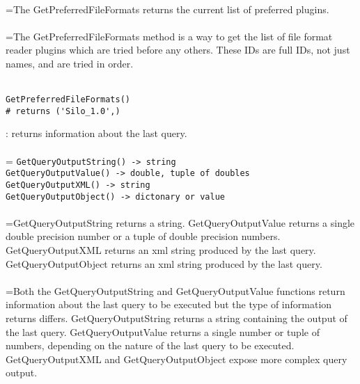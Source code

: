 \documentclass[10pt,a4paper]{report}
\begin{document}
 \\ 
\hangindent=\parindent The GetPreferredFileFormats returns the current list of preferred plugins. \\[-3mm] 

 \\ 
\hangindent=\parindent The GetPreferredFileFormats method is a way to get the list of file format reader plugins which are tried before any others. These IDs are full IDs, not just names, and are tried in order. \\[-3mm] 

\\[-6mm]
\begin{verbatim}GetPreferredFileFormats()
# returns ('Silo_1.0',)
\end{verbatim}
\newpage


{}
: returns information about the last query.\\[-3mm]

 \\ 
\hangindent=\parindent 
\verb!GetQueryOutputString() -> string!\\ 
\verb!GetQueryOutputValue() -> double, tuple of doubles!\\ 
\verb!GetQueryOutputXML() -> string!\\ 
\verb!GetQueryOutputObject() -> dictonary or value!\\ [-3mm]

 \\ 
\hangindent=\parindent GetQueryOutputString returns a string. GetQueryOutputValue returns a single double precision number or a tuple of double precision numbers. GetQueryOutputXML returns an xml string produced by the last query. GetQueryOutputObject returns an xml string produced by the last query. \\[-3mm] 

 \\ 
\hangindent=\parindent Both the GetQueryOutputString and GetQueryOutputValue functions return information about the last query to be executed but the type of information returns differs. GetQueryOutputString returns a string containing the output of the last query. GetQueryOutputValue returns a single number or tuple of numbers, depending on the nature of the last query to be executed.  GetQueryOutputXML and GetQueryOutputObject expose more complex query output. \\[-3mm] 
\end{document}
